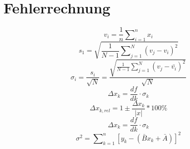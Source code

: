 \section{Fehlerrechnung}
\label{sec:Fehlerrechnung}

\begin{equation}
  v_i= \frac{1}{n}\sum\nolimits_{i=1}^n x_i
  \label{eqn:gl11}
\end{equation}
\begin{equation}
  \label{eqn:gl12}
  s_1= \sqrt{\frac{1}{N-1}\sum\nolimits_{j=1}^N(v_j-v_i)^2}
\end{equation}
\begin{equation}
  \label{eqn:gl13}
  \sigma_i=\frac{s_i}{\sqrt{N}}=
  \frac{\sqrt{\frac{1}{N-1}\sum\nolimits_{j=1}^N(v_j-\bar{v_i})^2}}{\sqrt{N}}
\end{equation}
\begin{equation}
  \Delta x_k = \frac{df}{dk} \cdot \sigma_k
\end{equation}
\begin{equation}
  \Delta x_{k,rel}=1 \pm \frac{\Delta x_k}{|x|}*100 \%
\end{equation}
\begin{equation}
  \Delta x_k = \frac{df}{dk} \cdot \sigma_k
\end{equation}
\begin{equation}
  \sigma^2=\sum\nolimits_{k=1}^n [y_k-(\bar{B}x_k+\bar{A})]^2
\end{equation}
